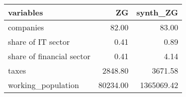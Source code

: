 \begin{tabular}{lrr}
\toprule
                variables &       ZG &   synth\_ZG \\
\midrule
                companies &    82.00 &      83.00 \\
       share of IT sector &     0.41 &       0.89 \\
share of financial sector &     0.41 &       4.14 \\
                    taxes &  2848.80 &    3671.58 \\
       working\_population & 80234.00 & 1365069.42 \\
\bottomrule
\end{tabular}
